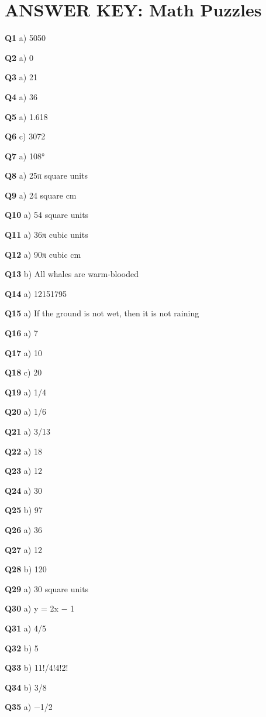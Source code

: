 \section{ANSWER KEY: Math Puzzles}

\textbf{Q1} a) 5050\par
\textbf{Q2} a) 0\par
\textbf{Q3} a) 21\par
\textbf{Q4} a) 36\par
\textbf{Q5} a) 1.618\par
\textbf{Q6} c) 3072\par
\textbf{Q7} a) 108°\par
\textbf{Q8} a) 25π square units\par
\textbf{Q9} a) 24 square cm\par
\textbf{Q10} a) 54 square units\par
\textbf{Q11} a) 36π cubic units\par
\textbf{Q12} a) 90π cubic cm\par
\textbf{Q13} b) All whales are warm‑blooded\par
\textbf{Q14} a) 12151795\par
\textbf{Q15} a) If the ground is not wet, then it is not raining\par
\textbf{Q16} a) 7\par
\textbf{Q17} a) 10\par
\textbf{Q18} c) 20\par
\textbf{Q19} a) 1/4\par
\textbf{Q20} a) 1/6\par
\textbf{Q21} a) 3/13\par
\textbf{Q22} a) 18\par
\textbf{Q23} a) 12\par
\textbf{Q24} a) 30\par
\textbf{Q25} b) 97\par
\textbf{Q26} a) 36\par
\textbf{Q27} a) 12\par
\textbf{Q28} b) 120\par
\textbf{Q29} a) 30 square units\par
\textbf{Q30} a) y = 2x − 1\par
\textbf{Q31} a) 4/5\par
\textbf{Q32} b) 5\par
\textbf{Q33} b) 11!/4!4!2!\par
\textbf{Q34} b) 3/8\par
\textbf{Q35} a) −1/2\par
